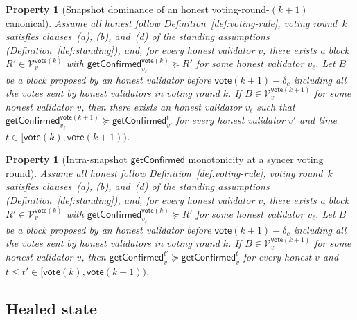 \ifx\litemode\undefined\documentclass{article}\fi
\newcommand{\V}[0]{\ensuremath{\mathcal{V}}}
\newcommand{\vote}{\ensuremath{\mathsf{vote}}}
\newcommand{\getConfirmed}{\textsf{getConfirmed}\xspace}
\theoremstyle{plain}
\newtheorem{property}[theorem]{Property}
\theoremstyle{definition}
\theoremstyle{remark}
\begin{document}
\begin{property}[Snapshot dominance of an honest voting-round-$(k+1)$ canonical]\label{prop:vote-carrier-dominance-snapshot}
Assume all honest follow Definition~\ref{def:voting-rule}, voting round~$k$ satisfies clauses~(a), (b), and~(d) of the standing assumptions (Definition~\ref{def:standing}), and, for every honest validator $v$, there exists a block $R' \in \V_v^{\vote(k)}$ with $\getConfirmed_{v_\ell}^{\vote(k)} \succeq R'$ for some honest validator $v_\ell$.
Let $B$ be a block proposed by an honest validator before $\vote(k+1) - \delta_c$ including all the votes sent by honest validators in voting round $k$.
If $B \in \V_v^{\vote(k+1)}$ for some honest validator $v$, then there exists an honest validator $v_\ell$ such that $\getConfirmed_{v_\ell}^{\vote(k+1)} \succeq \getConfirmed_{v'}^{t}$ for every honest validator $v'$ and time $t\in [\vote(k),\vote(k+1))$.
\end{property}

\begin{property}[Intra-snapshot $\getConfirmed$ monotonicity at a syncer voting round]\label{prop:vote-carrier-monotone-snapshot}
Assume all honest follow Definition~\ref{def:voting-rule}, voting round~$k$ satisfies clauses~(a), (b), and~(d) of the standing assumptions (Definition~\ref{def:standing}), and, for every honest validator $v$, there exists a block $R' \in \V_v^{\vote(k)}$ with $\getConfirmed_{v_\ell}^{\vote(k)} \succeq R'$ for some honest validator $v_\ell$.
Let $B$ be a block proposed by an honest validator before $\vote(k+1) - \delta_c$ including all the votes sent by honest validators in voting round $k$.
If $B \in \V_v^{\vote(k+1)}$ for some honest validator $v$, then $\getConfirmed_v^{t'} \succeq \getConfirmed_v^{t}$ for every honest $v$ and $t \leq t' \in [\vote(k), \vote(k+1))$.
\end{property}

\subsection{Healed state}\label{sec:healed}
\end{document}
